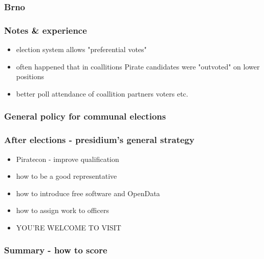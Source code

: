 \begin{frame}
	\frametitle{Brno}
\end{frame}
\begin{frame}
	\frametitle{Notes \& experience}
	\begin{itemize}
		\item election system allows "preferential votes"
		\item often happened that in coallitions Pirate candidates were "outvoted" on lower positions
		\item better poll attendance of coallition partners voters etc.
	\end{itemize}
\end{frame}
\begin{frame}
	\frametitle{General policy for communal elections}
\end{frame}
\begin{frame}
	\frametitle{After elections - presidium's general strategy}
	\begin{itemize}
		\item Piratecon - improve qualification
		\item how to be a good representative
		\item how to introduce free software and OpenData
		\item how to assign work to officers
		\item YOU'RE WELCOME TO VISIT
	\end{itemize}
\end{frame}
\begin{frame}
	\frametitle{Summary - how to score}
\end{frame}